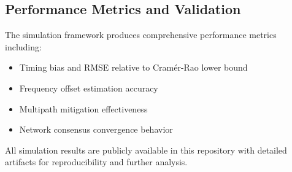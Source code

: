 \documentclass[10pt]{article}
\begin{document}
\subsection{Performance Metrics and Validation}
The simulation framework produces comprehensive performance metrics including:
\begin{itemize}[leftmargin=*]
  \item Timing bias and RMSE relative to Cram\'er-Rao lower bound
  \item Frequency offset estimation accuracy
  \item Multipath mitigation effectiveness
  \item Network consensus convergence behavior
\end{itemize}

All simulation results are publicly available in this repository with detailed artifacts for reproducibility and further analysis.
\end{document}
